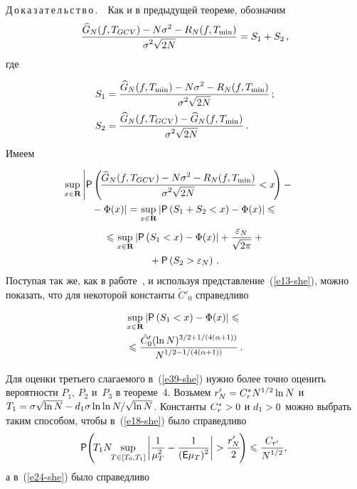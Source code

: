 \begin{multicols}{2}
\smallskip

\noindent
Д\,о\,к\,а\,з\,а\,т\,е\,л\,ь\,с\,т\,в\,о\,.\ \ Как и в предыдущей теореме, обозначим
$$
\displaystyle\frac{\displaystyle \widehat{G}_N(f,T_{GCV})-N\sigma^2-R_N(f,T_{\min})\mathstrut}{\displaystyle \sigma^2\sqrt{2N}\mathstrut}=S_1+S_2\,,
$$
где

\noindent
\begin{align*}
S_1&=\displaystyle\frac{\displaystyle \widehat{G}_N(f,T_{\min})-N\sigma^2-R_N(f,T_{\min})\mathstrut}{\displaystyle \sigma^2\sqrt{2N}\mathstrut}\,;\\
S_2&=\displaystyle\frac{\displaystyle \widehat{G}_N(f,T_{GCV})-\widehat{G}_N(f,T_{\min})\mathstrut}{\displaystyle \sigma^2\sqrt{2N}\mathstrut}\,.
\end{align*}
Имеем

\noindent
\begin{multline}
\hspace*{-3.8mm}\sup\limits_{x\in\mathbf{R}}\left\vert{\sf P}\left(\!\fr{\widehat{G}_N(f,T_{GCV})-N\sigma^2-R_N(f,T_{\min})}
{\sigma^2\sqrt{2N}}<x\!\right)-{}\right.\hspace*{-1.6102pt}\\
\left.{}-\Phi(x)\right\vert=
\sup\limits_{x\in\mathbf{R}}\abs{{\sf P}\left(S_1+S_2<x\right)-\Phi(x)}\leqslant{}\\
{}\leqslant\sup\limits_{x\in\mathbf{R}}\abs
{{\sf P}\left(S_1<x\right)-\Phi(x)}+\fr{\eps_N}{\sqrt{2\pi}}+{}\\
{}+{\sf P}\left(S_2>\eps_N\right)\,.\label{e39-she}
\end{multline}
Поступая так же, как в работе~\cite{8-she}, и используя представление~(\ref{e13-she}), 
можно показать, что для некоторой константы $\tilde{C}'_0$ справедливо

\noindent
\begin{multline}
\sup\limits_{x\in\mathbf{R}}\left\vert{\sf P}\left(S_1<x\right)-\Phi(x)\right\vert\leqslant{}\\{}\leqslant
\displaystyle\frac{\displaystyle \tilde{C}'_0(\ln N)^{{3}/{2}+{1}/(4(\alpha+1))}\mathstrut}{\displaystyle N^{{1}/{2}-{1}/(4(\alpha+1))}\mathstrut}\,.\label{e40-she}
\end{multline}

Для оценки третьего слагаемого в~(\ref{e39-she}) нужно более точно оценить вероятности $P_1$, $P_2$ и~$P_3$ в теореме~4. 
Возьмем $r'_N\hm=C^*_r N^{1/2}\ln N$ и $T_1\hm=\sigma\sqrt{\ln N}\hm-d_1\sigma\ln\ln N/\sqrt{\ln N}$. Константы $C^*_r\hm>0$ 
и $d_1\hm>0$ можно выбрать таким способом, чтобы в~(\ref{e18-she}) было справедливо
\begin{equation}
\hspace*{-2mm}{\sf P}\!\left(\!T_1N\!\!\sup\limits_{T\in[T_0,T_1]}\abs{\fr{1}{\mu^2_T}-\fr{1}{({\sf E}\mu_T)^2}}>
\fr{r'_N}{2}\!\right)\leqslant \fr{C_{r'}}{N^{{1}/{2}}},\!\!\label{e41-she}
\end{equation}
а в~(\ref{e24-she}) было справедливо


\end{multicols}
